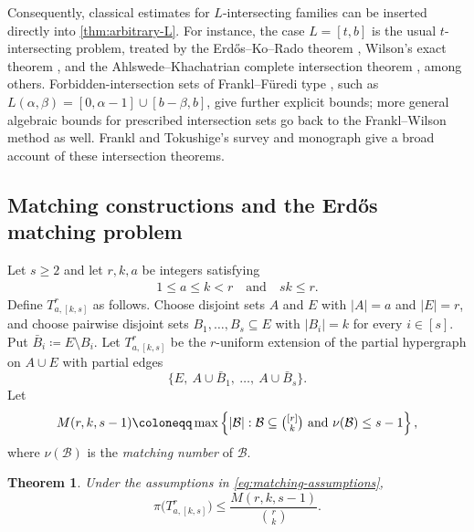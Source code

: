\documentclass[10pt,a4paper]{article}
\theoremstyle{plain}
\newtheorem{theorem}{Theorem}[section]
\theoremstyle{definition}
\theoremstyle{plain}
\newcommand{\calB}{\mathcal B}
\begin{document}
Consequently, classical estimates for $L$-intersecting families can be inserted directly into \cref{thm:arbitrary-L}.  For instance, the case $L=[t,b]$ is the usual $t$-intersecting problem, treated by the Erd\H{o}s--Ko--Rado theorem \cite{EKR61}, Wilson's exact theorem \cite{Wilson84}, and the Ahlswede--Khachatrian complete intersection theorem \cite{AhlswedeKhachatrian97}, among others.  Forbidden-intersection sets of Frankl--F\"uredi type \cite{FranklFuredi85}, such as $L(\alpha,\beta)=[0,\alpha-1]\cup[b-\beta,b]$, give further explicit bounds; more general algebraic bounds for prescribed intersection sets go back to the Frankl--Wilson method \cite{FranklWilson81} as well.  Frankl and Tokushige's survey \cite{FranklTokushige16} and monograph \cite{FranklTokushige18} give a broad account of these intersection theorems.

\subsection{Matching constructions and the Erd\H{o}s matching problem}

Let $s\ge2$ and let $r,k,a$ be integers satisfying
\begin{equation}\label{eq:matching-assumptions}
\begin{gathered}
        1\le a\le k<r
        \quad\text{and}\quad sk\le r.
\end{gathered}
\end{equation}
Define $T^r_{a,[k,s]}$ as follows.  Choose disjoint sets $A$ and $E$ with $|A|=a$ and $|E|=r$, and choose pairwise disjoint sets $B_1,\ldots,B_s\subseteq E$ with $|B_i|=k$ for every $i\in[s]$.  Put $\bar B_i\coloneqq E\setminus B_i$.  Let $T^r_{a,[k,s]}$ be the $r$-uniform extension of the partial hypergraph on $A\cup E$ with partial edges
\[
        \{E,~ A\cup\bar B_1,~\ldots,~ A\cup\bar B_s\}.
\]
Let
\[
        M(r,k,s-1)\coloneqq\max\left\{|\calB|:\calB\subseteq\tbinom{[r]}{k}\text{ and } \nu(\calB)\le s-1\right\},
\]
where $\nu(\calB)$ is the \emph{matching number} of $\calB$.


\begin{theorem}\label{thm:matching-main}
Under the assumptions in \cref{eq:matching-assumptions},
\[
        \pi\bigl(T^r_{a,[k,s]}\bigr)
        \le \frac{M(r,k,s-1)}{\binom{r}{k}}.
\]
\end{theorem}
\end{document}
